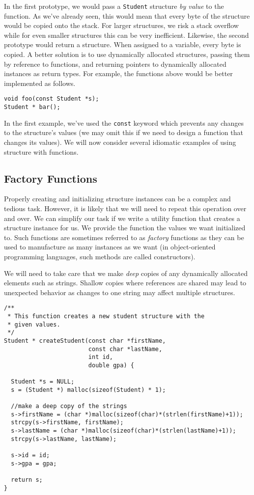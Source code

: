 In the first prototype, we would pass a \texttt{Student} structure
\emph{by value} to the function.  As we've already seen, this would
mean that every byte of the structure would be copied onto the stack.
For larger structures, we risk a stack overflow while for even smaller
structures this can be very inefficient.  Likewise, the second prototype
would return a structure.  When assigned to a variable, every byte is
copied.  A better solution is to use dynamically
allocated structures, passing them by reference to functions, and
returning pointers to dynamically allocated instances as return types.
For example, the functions above would be better implemented as follows.

\begin{verbatim}
void foo(const Student *s);
Student * bar();
\end{verbatim}

In the first example, we've used the \texttt{const} keyword which
prevents any changes to the structure's values (we may omit this if
we need to design a function that changes its values).  We will now
consider several idiomatic examples of using structure with functions.

\subsection{Factory Functions}

Properly creating and initializing structure instances can be a
complex and tedious task.  However, it is likely that we will need
to repeat this operation over and over.  We can simplify our task
if we write a utility function that creates a structure instance for us.
We provide the function the values we want initialized to.  
Such functions are sometimes referred to as \emph{factory} functions
as they can be used to manufacture as many instances as we want
(in object-oriented programming languages, such methods are called
constructors).

We will need to take care that we make  \emph{deep} copies of 
any dynamically allocated elements such as strings.  Shallow
copies  where references are shared may lead to unexpected 
behavior as changes to one string may affect multiple structures.

\begin{verbatim}
/**
 * This function creates a new student structure with the
 * given values.
 */
Student * createStudent(const char *firstName, 
                        const char *lastName, 
                        int id, 
                        double gpa) {

  Student *s = NULL;
  s = (Student *) malloc(sizeof(Student) * 1);

  //make a deep copy of the strings
  s->firstName = (char *)malloc(sizeof(char)*(strlen(firstName)+1));
  strcpy(s->firstName, firstName);
  s->lastName = (char *)malloc(sizeof(char)*(strlen(lastName)+1));
  strcpy(s->lastName, lastName);

  s->id = id;
  s->gpa = gpa;

  return s;
}
\end{verbatim}


